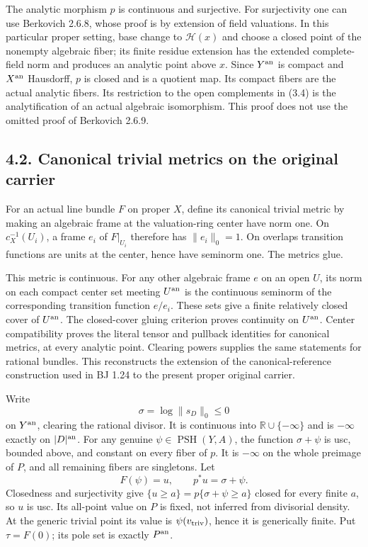 \documentclass[
  10pt,
]{article}
\begin{document}
The analytic morphism \(p\) is continuous and surjective. For
surjectivity one can use Berkovich 2.6.8, whose proof is by extension of
field valuations. In this particular proper setting, base change to
\(\mathcal H(x)\) and choose a closed point of the nonempty algebraic
fiber; its finite residue extension has the extended complete-field norm
and produces an analytic point above \(x\). Since \(Y^{\rm an}\) is
compact and \(X^{\rm an}\) Hausdorff, \(p\) is closed and is a quotient
map. Its compact fibers are the actual analytic fibers. Its restriction
to the open complements in (3.4) is the analytification of an actual
algebraic isomorphism. This proof does not use the omitted proof of
Berkovich 2.6.9.

\subsection{4.2. Canonical trivial metrics on the original
carrier}\label{canonical-trivial-metrics-on-the-original-carrier}

For an actual line bundle \(F\) on proper \(X\), define its canonical
trivial metric by making an algebraic frame at the valuation-ring center
have norm one. On \(c_X^{-1}(U_i)\), a frame \(e_i\) of \(F|_{U_i}\)
therefore has \(\|e_i\|_0=1\). On overlaps transition functions are
units at the center, hence have seminorm one. The metrics glue.

This metric is continuous. For any other algebraic frame \(e\) on an
open \(U\), its norm on each compact center set meeting \(U^{\rm an}\)
is the continuous seminorm of the corresponding transition function
\(e/e_i\). These sets give a finite relatively closed cover of
\(U^{\rm an}\). The closed-cover gluing criterion proves continuity on
\(U^{\rm an}\). Center compatibility proves the literal tensor and
pullback identities for canonical metrics, at every analytic point.
Clearing powers supplies the same statements for rational bundles. This
reconstructs the extension of the canonical-reference construction used
in BJ 1.24 to the present proper original carrier.

Write \[\sigma=\log\|s_D\|_0\leq0\] on \(Y^{\rm an}\), clearing the
rational divisor. It is continuous into \(\mathbb R\cup\{-\infty\}\) and
is \(-\infty\) exactly on \(|D|^{\rm an}\). For any genuine
\(\psi\in\operatorname{PSH}(Y,A)\), the function \(\sigma+\psi\) is usc,
bounded above, and constant on every fiber of \(p\). It is \(-\infty\)
on the whole preimage of \(P\), and all remaining fibers are singletons.
Let \[F(\psi)=u,\qquad p^*u=\sigma+\psi.                    \tag{4.1}\]
Closedness and surjectivity give \(\{u\geq a\}=p\{\sigma+\psi\geq a\}\)
closed for every finite \(a\), so \(u\) is usc. Its all-point value on
\(P\) is fixed, not inferred from divisorial density. At the generic
trivial point its value is \(\psi(v_{\rm triv})\), hence it is
generically finite. Put \(\tau=F(0)\); its pole set is exactly
\(P^{\rm an}\).
\end{document}
